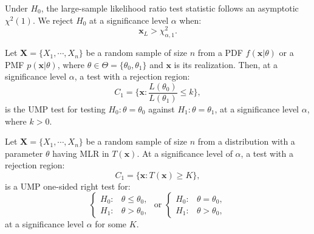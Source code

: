 \documentclass{huhtakm-template-book-v2}
\begin{document}
    \begin{thm}
        Under $H_{0}$, the large-sample likelihood ratio test statistic follows an asymptotic $\chi^{2}(1)$. We reject $H_{0}$ at a significance level $\alpha$ when:
        \begin{equation*}
            \mathbf{x}_{L}>\chi^{2}_{\alpha,1}.
        \end{equation*}
    \end{thm}
    \begin{lem}
        Let $\mathbf{X}=\{X_{1},\cdots,X_{n}\}$ be a random sample of size $n$ from a PDF $f(\mathbf{x}|\theta)$ or a PMF $p(\mathbf{x}|\theta)$, where $\theta\in\Theta=\{\theta_{0},\theta_{1}\}$ and $\mathbf{x}$ is its realization. Then, at a significance level $\alpha$, a test with a rejection region:
        \begin{equation*}
            C_{1}=\biggl\{\mathbf{x}:\frac{L(\theta_{0})}{L(\theta_{1})}\leq k\biggr\},
        \end{equation*}
        is the UMP test for testing $H_{0}:\theta=\theta_{0}$ against $H_{1}:\theta=\theta_{1}$, at a significance level $\alpha$, where $k>0$.
    \end{lem}
    \begin{thm}
        Let $\mathbf{X}=\{X_{1},\cdots,X_{n}\}$ be a random sample of size $n$ from a distribution with a parameter $\theta$ having MLR in $T(\mathbf{x})$. At a significance level of $\alpha$, a test with a rejection region:
        \begin{equation*}
            C_{1}=\{\mathbf{x}:T(\mathbf{x})\geq K\},
        \end{equation*}
        is a UMP one-sided right test for:
        \begin{equation*}
            \begin{cases}
                H_{0}: &\theta\leq\theta_{0},\\
                H_{1}: &\theta>\theta_{0},
            \end{cases}\text{ or }\begin{cases}
                H_{0}: &\theta=\theta_{0},\\
                H_{1}: &\theta>\theta_{0},
            \end{cases}
        \end{equation*}
        at a significance level $\alpha$ for some $K$.
    \end{thm}
\end{document}
